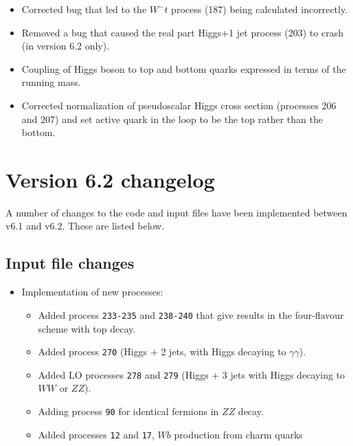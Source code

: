 \documentclass{article}
\begin{document}
{{{{{{\begin{itemize}
\item Corrected bug that led to the $W^-t$ process (187) being calculated incorrectly.

\item Removed a bug that caused the real part Higgs+1 jet process (203) 
to crash (in version 6.2 only).

\item
Coupling of Higgs boson to top and bottom quarks expressed in terms of the running mass.

\item
Corrected normalization of pseudoscalar Higgs cross section (processes 206 and 207)
and set active quark in the loop to be the top rather than the bottom.

\end{itemize}

\section{Version 6.2 changelog}
\label{changelog6.2}

A number of changes to the code and input files have been implemented
between v6.1 and v6.2. These are listed below.

\subsection{Input file changes}
\begin{itemize}
\item Implementation of new processes:
\begin{itemize}
\item 
Added process {\tt 233-235} and {\tt 238-240} that give results in the four-flavour scheme
      with top decay.
\item 
Added process {\tt 270} (Higgs + 2 jets, with Higgs decaying to $\gamma \gamma$).
\item 
Added LO processes {\tt 278} and {\tt 279} (Higgs + 3 jets with Higgs decaying to $WW$ or $ZZ$).
\item 
Adding process {\tt 90} for identical fermions in $ZZ$ decay.
\item
Added processes {\tt 12} and {\tt 17}, $Wb$ production from charm quarks
\end{itemize}
\end{itemize}


}}}}}}
\end{document}
